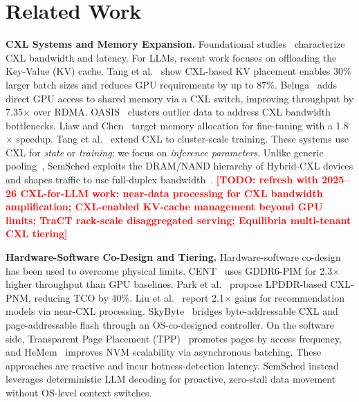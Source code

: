 \documentclass[10pt,conference,letterpaper]{IEEEtran}
\newcommand{\todo}[1]{\textcolor{red}{\textbf{[TODO: #1]}}}
\begin{document}
\section{Related Work}
\label{sec:related}

\noindent
\textbf{CXL Systems and Memory Expansion.}
Foundational studies~\cite{wang2024exploring,wang2025performance,liu2024dissecting} characterize CXL bandwidth and latency. For LLMs, recent work focuses on offloading the Key-Value (KV) cache. Tang et al.~\cite{tang2024exploring} show CXL-based KV placement enables 30\% larger batch sizes and reduces GPU requirements by up to 87\%. Beluga~\cite{yang2025beluga} adds direct GPU access to shared memory via a CXL switch, improving throughput by 7.35$\times$ over RDMA. OASIS~\cite{seo2025oasis} clusters outlier data to address CXL bandwidth bottlenecks. Liaw and Chen~\cite{liaw2025analysis} target memory allocation for fine-tuning with a 1.8$\times$ speedup. Tang et al.~\cite{tang2024simulating} extend CXL to cluster-scale training. These systems use CXL for \emph{state} or \emph{training}; we focus on \emph{inference parameters}. Unlike generic pooling~\cite{li2023pond}, SemSched exploits the DRAM/NAND hierarchy of Hybrid-CXL devices and shapes traffic to use full-duplex bandwidth~\cite{yang2025cxlaimpod}.
\todo{refresh with 2025--26 CXL-for-LLM work: near-data processing for CXL bandwidth amplification; CXL-enabled KV-cache management beyond GPU limits; TraCT rack-scale disaggregated serving; Equilibria multi-tenant CXL tiering}

\noindent
\textbf{Hardware-Software Co-Design and Tiering.}
Hardware-software co-design has been used to overcome physical limits. CENT~\cite{gu2025pim} uses GDDR6-PIM for 2.3$\times$ higher throughput than GPU baselines. Park et al.~\cite{park2024lpddr} propose LPDDR-based CXL-PNM, reducing TCO by 40\%. Liu et al.~\cite{liu2024enabling} report 2.1$\times$ gains for recommendation models via near-CXL processing. SkyByte~\cite{zhang2025skybyte} bridges byte-addressable CXL and page-addressable flash through an OS-co-designed controller. On the software side, Transparent Page Placement (TPP)~\cite{marufh2023tpp} promotes pages by access frequency, and HeMem~\cite{raybuck2021hemem} improves NVM scalability via asynchronous batching. These approaches are reactive and incur hotness-detection latency. SemSched instead leverages deterministic LLM decoding for proactive, zero-stall data movement without OS-level context switches.
\end{document}
